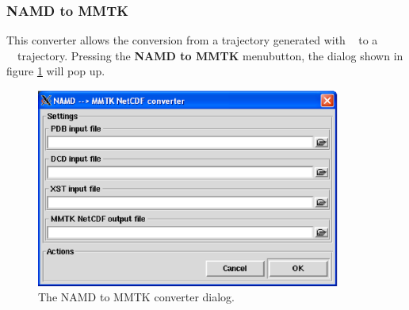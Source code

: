 \documentclass[a4paper,11pt]{report}
\begin{document}
\subsubsection{NAMD to MMTK}
\label{namd_to_mmtk}
This converter allows the conversion from a trajectory generated with \NAMD\ \cite{NAMD} to a \MMTK\ \NetCDF\ trajectory. 
Pressing the \textbf{NAMD to MMTK} menubutton, the dialog shown in figure \ref{fig:namd_converter} will pop up.
\newpage
\begin{figure}[h!]
\begin{center}
\includegraphics[width=10cm]{Figures/namd_converter.eps}
\end{center}
\caption[The NAMD to MMTK converter dialog]{The NAMD to MMTK converter dialog.}
\label{fig:namd_converter}
\end{figure}   
\end{document}
